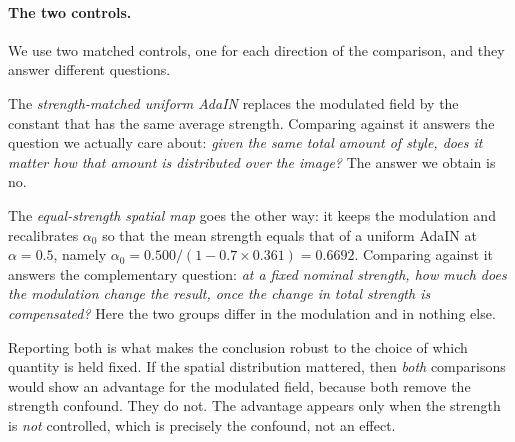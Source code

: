 \paragraph{The two controls.}
We use two matched controls, one for each direction of the comparison, and
they answer different questions.

The \emph{strength-matched uniform AdaIN} replaces the modulated field by
the constant that has the same average strength. Comparing against it
answers the question we actually care about: \emph{given the same total
amount of style, does it matter how that amount is distributed over the
image?} The answer we obtain is no.

The \emph{equal-strength spatial map} goes the other way: it keeps the
modulation and recalibrates $\alpha_0$ so that the mean strength equals
that of a uniform AdaIN at $\alpha = 0.5$, namely
$\alpha_0 = 0.500/(1-0.7\times0.361) = 0.6692$. Comparing against it
answers the complementary question: \emph{at a fixed nominal strength, how
much does the modulation change the result, once the change in total
strength is compensated?} Here the two groups differ in the modulation and
in nothing else.

Reporting both is what makes the conclusion robust to the choice of which
quantity is held fixed. If the spatial distribution mattered, then
\emph{both} comparisons would show an advantage for the modulated field,
because both remove the strength confound. They do not. The advantage
appears only when the strength is \emph{not} controlled, which is precisely
the confound, not an effect.
